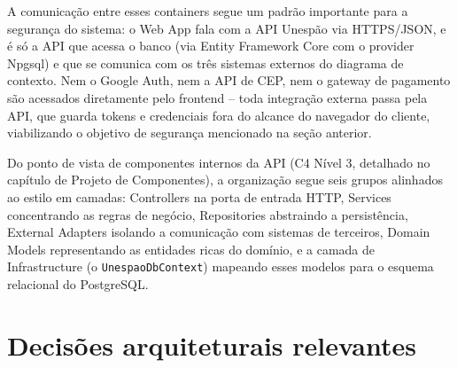 \documentclass[a4paper,12pt,oneside,openany]{book}
\begin{document}
A comunicação entre esses containers segue um padrão importante para a segurança do sistema: o Web App fala com a API Unespão via HTTPS/JSON, e é só a API que acessa o banco (via Entity Framework Core com o provider Npgsql) e que se comunica com os três sistemas externos do diagrama de contexto. Nem o Google Auth, nem a API de CEP, nem o gateway de pagamento são acessados diretamente pelo frontend -- toda integração externa passa pela API, que guarda tokens e credenciais fora do alcance do navegador do cliente, viabilizando o objetivo de segurança mencionado na seção anterior.

Do ponto de vista de componentes internos da API (C4 Nível 3, detalhado no capítulo de Projeto de Componentes), a organização segue seis grupos alinhados ao estilo em camadas: Controllers na porta de entrada HTTP, Services concentrando as regras de negócio, Repositories abstraindo a persistência, External Adapters isolando a comunicação com sistemas de terceiros, Domain Models representando as entidades ricas do domínio, e a camada de Infrastructure (o \texttt{UnespaoDbContext}) mapeando esses modelos para o esquema relacional do PostgreSQL.

\section{Decisões arquiteturais relevantes}
\end{document}
